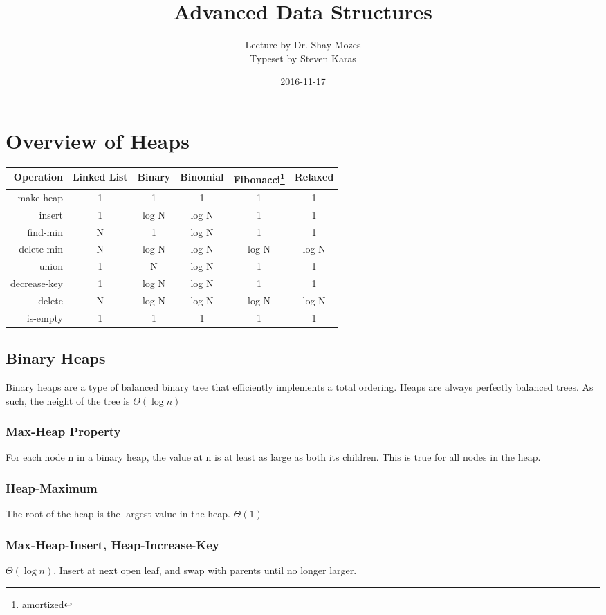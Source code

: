 \documentclass[a4paper]{article}
\title{Advanced Data Structures}
\date{2016-11-17}
\author{Lecture by Dr. Shay Mozes\\Typeset by Steven Karas}
\begin{document}
\maketitle

\section{Overview of Heaps}

\begin{tabu} to \linewidth{|r|c|c|c|c|c|}
\hline
Operation & Linked List & Binary & Binomial & Fibonacci\footnote{amortized} & Relaxed \\
\hline
make-heap & 1 & 1 & 1 & 1 & 1 \\
\hline
insert & 1 & log N & log N & 1 & 1 \\
\hline
find-min & N & 1 & log N & 1 & 1 \\
\hline
delete-min & N & log N & log N & log N & log N \\
\hline
union & 1 & N & log N\footnotemark[1] & 1 & 1 \\
\hline
decrease-key & 1 & log N & log N & 1 & 1 \\
\hline
delete & N & log N & log N & log N & log N \\
\hline
is-empty & 1 & 1 & 1 & 1 & 1 \\
\hline
\end{tabu}

\subsection{Binary Heaps}
Binary heaps are a type of balanced binary tree that efficiently implements a total ordering. Heaps are always perfectly balanced trees. As such, the height of the tree is $\Theta(\log n)$

\subsubsection{Max-Heap Property}
For each node n in a binary heap, the value at n is at least as large as both its children. This is true for all nodes in the heap.

\subsubsection{Heap-Maximum}
The root of the heap is the largest value in the heap. $\Theta(1)$

\subsubsection{Max-Heap-Insert, Heap-Increase-Key}
$\Theta(\log n)$. Insert at next open leaf, and swap with parents until no longer larger.
\end{document}
